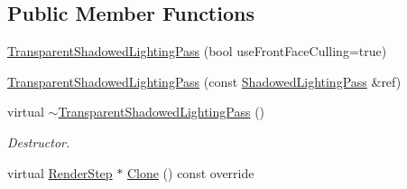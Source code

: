 \subsection*{Public Member Functions}
\begin{DoxyCompactItemize}
\item 
\mbox{\hyperlink{class_geometry_engine_1_1_geometry_render_step_1_1_transparent_shadowed_lighting_pass_a12c23cc6f03bcf838c0941f9d1cb3c81}{Transparent\+Shadowed\+Lighting\+Pass}} (bool use\+Front\+Face\+Culling=true)
\item 
\mbox{\hyperlink{class_geometry_engine_1_1_geometry_render_step_1_1_transparent_shadowed_lighting_pass_a5154522329ead1d111ebbcc34af4e662}{Transparent\+Shadowed\+Lighting\+Pass}} (const \mbox{\hyperlink{class_geometry_engine_1_1_geometry_render_step_1_1_shadowed_lighting_pass}{Shadowed\+Lighting\+Pass}} \&ref)
\item 
\mbox{\label{class_geometry_engine_1_1_geometry_render_step_1_1_transparent_shadowed_lighting_pass_a781a46fa53c307d68e7566951defdfa1}} 
virtual \mbox{\hyperlink{class_geometry_engine_1_1_geometry_render_step_1_1_transparent_shadowed_lighting_pass_a781a46fa53c307d68e7566951defdfa1}{$\sim$\+Transparent\+Shadowed\+Lighting\+Pass}} ()
\begin{DoxyCompactList}\small\item\em Destructor. \end{DoxyCompactList}\item 
virtual \mbox{\hyperlink{class_geometry_engine_1_1_geometry_render_step_1_1_render_step}{Render\+Step}} $\ast$ \mbox{\hyperlink{class_geometry_engine_1_1_geometry_render_step_1_1_transparent_shadowed_lighting_pass_a56d2ef131669ae3964a04cb54e6c3b0f}{Clone}} () const override
\end{DoxyCompactItemize}
